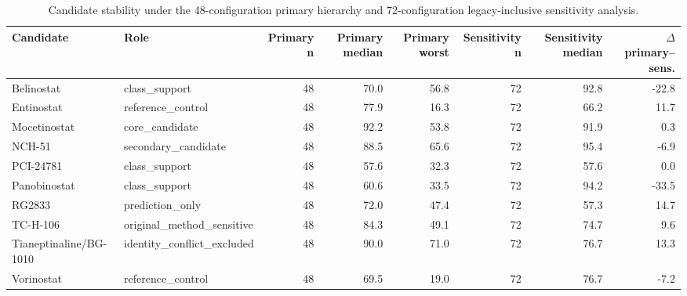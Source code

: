 \begingroup
\scriptsize
\begin{table}[H]
\centering
\caption{Candidate stability under the 48-configuration primary hierarchy and 72-configuration legacy-inclusive sensitivity analysis.}
\label{tab:s_stability}
\begin{tabular}{@{}llrrrrrr@{}}
\toprule
Candidate & Role & Primary n & Primary median & Primary worst & Sensitivity n & Sensitivity median & $\Delta$ primary--sens. \\
\midrule
Belinostat & class\_support & 48 & 70.0 & 56.8 & 72 & 92.8 & -22.8 \\
Entinostat & reference\_control & 48 & 77.9 & 16.3 & 72 & 66.2 & 11.7 \\
Mocetinostat & core\_candidate & 48 & 92.2 & 53.8 & 72 & 91.9 & 0.3 \\
NCH-51 & secondary\_candidate & 48 & 88.5 & 65.6 & 72 & 95.4 & -6.9 \\
PCI-24781 & class\_support & 48 & 57.6 & 32.3 & 72 & 57.6 & 0.0 \\
Panobinostat & class\_support & 48 & 60.6 & 33.5 & 72 & 94.2 & -33.5 \\
RG2833 & prediction\_only & 48 & 72.0 & 47.4 & 72 & 57.3 & 14.7 \\
TC-H-106 & original\_method\_sensitive & 48 & 84.3 & 49.1 & 72 & 74.7 & 9.6 \\
Tianeptinaline/BG-1010 & identity\_conflict\_excluded & 48 & 90.0 & 71.0 & 72 & 76.7 & 13.3 \\
Vorinostat & reference\_control & 48 & 69.5 & 19.0 & 72 & 76.7 & -7.2 \\
\bottomrule
\end{tabular}
\end{table}
\endgroup
